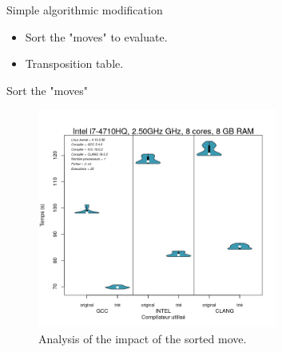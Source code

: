 \documentclass{beamer}
\begin{document}
\begin{frame}{Simple algorithmic modification}

\begin{itemize}
  \item
  Sort the "moves" to evaluate.
  \item
  Transposition table.
 \end{itemize}	
\end{frame}

\begin{frame}{Sort the "moves"}
	\begin{figure}
      \includegraphics[width=0.7\textwidth]{trie.png}
      \caption{Analysis of the impact of the sorted move.\label{Fig:trie}}
	\end{figure}
\end{frame}
\end{document}
